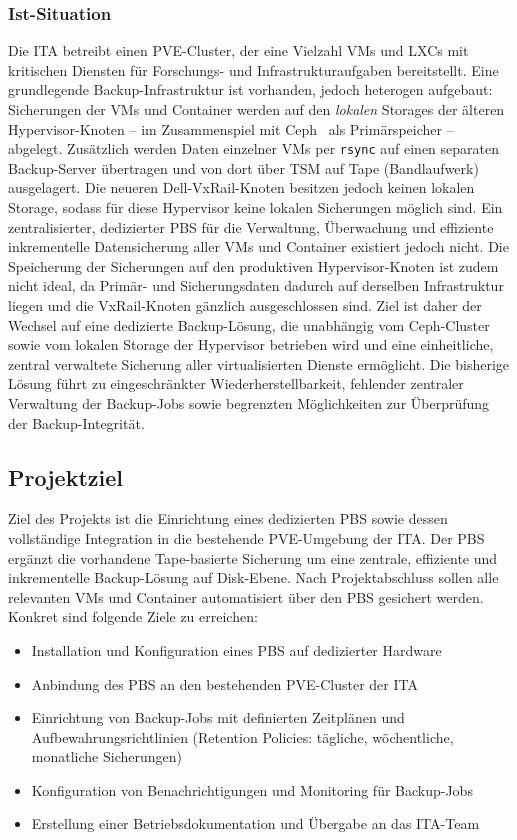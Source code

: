 \subsubsection{Ist-Situation}
Die \ac{ITA} betreibt einen \ac{PVE}-Cluster, der eine Vielzahl
\acp{VM} und \acp{LXC} mit kritischen Diensten für Forschungs- und
Infrastrukturaufgaben bereitstellt.
Eine grundlegende Backup-Infrastruktur ist vorhanden, jedoch
heterogen aufgebaut: Sicherungen der \acp{VM} und Container werden
auf den \emph{lokalen} Storages der älteren Hypervisor-Knoten -- im
Zusammenspiel mit Ceph~\citep{CephDocs} als Primärspeicher --
abgelegt. Zusätzlich werden Daten einzelner \acp{VM} per
\texttt{rsync} auf einen separaten Backup-Server übertragen und von
dort über \ac{TSM} auf Tape (Bandlaufwerk) ausgelagert.
Die neueren Dell-VxRail-Knoten besitzen jedoch keinen lokalen
Storage, sodass für diese Hypervisor keine lokalen Sicherungen
möglich sind.
Ein zentralisierter, dedizierter \acl{PBS} für die Verwaltung, Überwachung
und effiziente inkrementelle Datensicherung aller \acp{VM} und Container
existiert jedoch nicht.
Die Speicherung der Sicherungen auf den produktiven Hypervisor-Knoten
ist zudem nicht ideal, da Primär- und Sicherungsdaten dadurch auf
derselben Infrastruktur liegen und die VxRail-Knoten gänzlich
ausgeschlossen sind.
Ziel ist daher der Wechsel auf eine dedizierte Backup-Lösung, die
unabhängig vom Ceph-Cluster sowie vom lokalen Storage der
Hypervisor betrieben wird und eine einheitliche, zentral verwaltete
Sicherung aller virtualisierten Dienste ermöglicht.
Die bisherige Lösung führt zu eingeschränkter Wiederherstellbarkeit,
fehlender zentraler Verwaltung der Backup-Jobs sowie begrenzten
Möglichkeiten zur Überprüfung der Backup-Integrität.

\subsection{Projektziel}
\label{sec:Projektziel}
Ziel des Projekts ist die Einrichtung eines dedizierten \acl{PBS} sowie
dessen vollständige Integration in die bestehende \ac{PVE}-Umgebung der
\ac{ITA}.
Der \ac{PBS} ergänzt die vorhandene Tape-basierte Sicherung um eine
zentrale, effiziente und inkrementelle Backup-Lösung auf Disk-Ebene.
Nach Projektabschluss sollen alle relevanten \acp{VM} und Container
automatisiert über den \ac{PBS} gesichert werden.
Konkret sind folgende Ziele zu erreichen:
\begin{itemize}
    \item Installation und Konfiguration eines \acl{PBS} auf dedizierter Hardware
    \item Anbindung des \ac{PBS} an den bestehenden \ac{PVE}-Cluster der \ac{ITA}
    \item Einrichtung von Backup-Jobs mit definierten Zeitplänen und Aufbewahrungsrichtlinien (Retention Policies: tägliche, wöchentliche, monatliche Sicherungen)
    \item Konfiguration von Benachrichtigungen und Monitoring für Backup-Jobs
    \item Erstellung einer Betriebsdokumentation und Übergabe an das \ac{ITA}-Team
\end{itemize}

